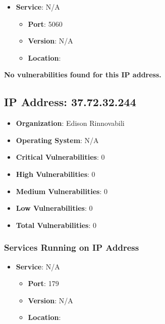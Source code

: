 \documentclass{article}
\begin{document}
\begin{itemize}
    
        \item \textbf{Service}: N/A
        \begin{itemize}
            \item \textbf{Port}: 5060
            \item \textbf{Version}:  N/A 
            \item \textbf{Location}: \href{  }{  }
        \end{itemize}
    
\end{itemize}


\textbf{No vulnerabilities found for this IP address.}




\clearpage



\subsection{IP Address: 37.72.32.244}

\begin{itemize}
    \item \textbf{Organization}: Edison Rinnovabili
    \item \textbf{Operating System}:  N/A 
    \item \textbf{Critical Vulnerabilities}: 0
    \item \textbf{High Vulnerabilities}: 0
    \item \textbf{Medium Vulnerabilities}: 0
    \item \textbf{Low Vulnerabilities}: 0
    \item \textbf{Total Vulnerabilities}: 0
\end{itemize}

\subsubsection*{Services Running on IP Address}

\begin{itemize}
    
        \item \textbf{Service}: N/A
        \begin{itemize}
            \item \textbf{Port}: 179
            \item \textbf{Version}:  N/A 
            \item \textbf{Location}: \href{  }{  }
        \end{itemize}
    
\end{itemize}
\end{document}
